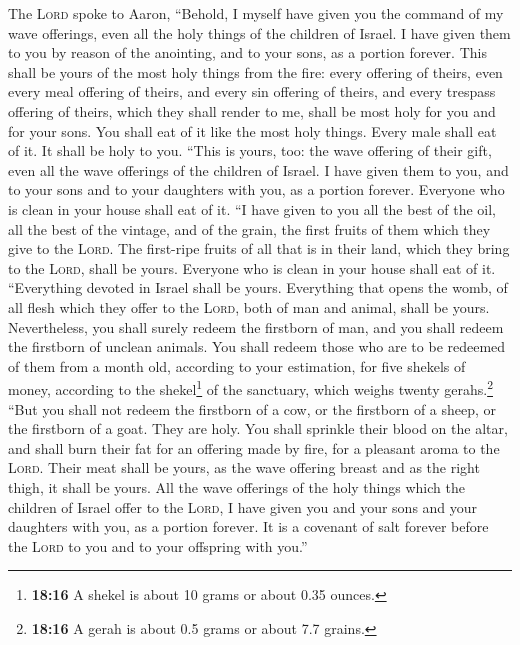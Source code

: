  The \textsc{Lord} spoke to Aaron, ``Behold, I myself have
given you the command of my wave offerings, even all the holy things of
the children of Israel. I have given them to you by reason of the
anointing, and to your sons, as a portion forever.  This
shall be yours of the most holy things from the fire: every offering of
theirs, even every meal offering of theirs, and every sin offering of
theirs, and every trespass offering of theirs, which they shall render
to me, shall be most holy for you and for your sons.  You
shall eat of it like the most holy things. Every male shall eat of it.
It shall be holy to you.  ``This is yours, too: the wave
offering of their gift, even all the wave offerings of the children of
Israel. I have given them to you, and to your sons and to your daughters
with you, as a portion forever. Everyone who is clean in your house
shall eat of it.  ``I have given to you all the best of
the oil, all the best of the vintage, and of the grain, the first fruits
of them which they give to the \textsc{Lord}.  The
first-ripe fruits of all that is in their land, which they bring to the
\textsc{Lord}, shall be yours. Everyone who is clean in your house shall
eat of it.  ``Everything devoted in Israel shall be
yours.  Everything that opens the womb, of all flesh
which they offer to the \textsc{Lord}, both of man and animal, shall be
yours. Nevertheless, you shall surely redeem the firstborn of man, and
you shall redeem the firstborn of unclean animals.  You
shall redeem those who are to be redeemed of them from a month old,
according to your estimation, for five shekels of money, according to
the shekel\footnote{\textbf{18:16} A shekel is about 10 grams or about
  0.35 ounces.} of the sanctuary, which weighs twenty gerahs.\footnote{\textbf{18:16}
  A gerah is about 0.5 grams or about 7.7 grains.}  ``But
you shall not redeem the firstborn of a cow, or the firstborn of a
sheep, or the firstborn of a goat. They are holy. You shall sprinkle
their blood on the altar, and shall burn their fat for an offering made
by fire, for a pleasant aroma to the \textsc{Lord}. 
Their meat shall be yours, as the wave offering breast and as the right
thigh, it shall be yours.  All the wave offerings of the
holy things which the children of Israel offer to the \textsc{Lord}, I
have given you and your sons and your daughters with you, as a portion
forever. It is a covenant of salt forever before the \textsc{Lord} to
you and to your offspring with you.''

